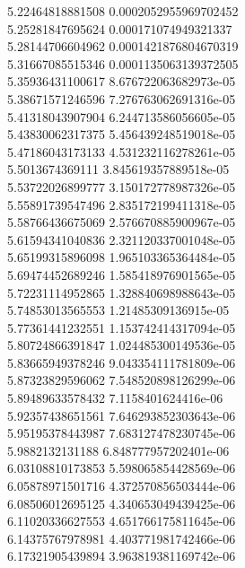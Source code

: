 {5.22464818881508 0.0002052955969702452 \\
5.25281847695624 0.000171074949321337 \\
5.28144706604962 0.0001421876804670319 \\
5.31667085515346 0.0001135063139372505 \\
5.35936431100617 8.676722063682973e-05 \\
5.38671571246596 7.276763062691316e-05 \\
5.41318043907904 6.244713586056605e-05 \\
5.43830062317375 5.456439248519018e-05 \\
5.47186043173133 4.531232116278261e-05 \\
5.5013674369111 3.845619357889518e-05 \\
5.53722026899777 3.150172778987326e-05 \\
5.55891739547496 2.835172199411318e-05 \\
5.58766436675069 2.576670885900967e-05 \\
5.61594341040836 2.321120337001048e-05 \\
5.65199315896098 1.965103365364484e-05 \\
5.69474452689246 1.585418976901565e-05 \\
5.72231114952865 1.328840698988643e-05 \\
5.74853013565553 1.21485309136915e-05 \\
5.77361441232551 1.153742414317094e-05 \\
5.80724866391847 1.024485300149536e-05 \\
5.83665949378246 9.043354111781809e-06 \\
5.87323829596062 7.548520898126299e-06 \\
5.89489633578432 7.1158401624416e-06 \\
5.92357438651561 7.646293852303643e-06 \\
5.95195378443987 7.683127478230745e-06 \\
5.9882132131188 6.848777957202401e-06 \\
6.03108810173853 5.598065854428569e-06 \\
6.05878971501716 4.372570856503444e-06 \\
6.08506012695125 4.340653049439425e-06 \\
6.11020336627553 4.651766175811645e-06 \\
6.14375767978981 4.403771981742466e-06 \\
6.17321905439894 3.963819381169742e-06 \\
}
